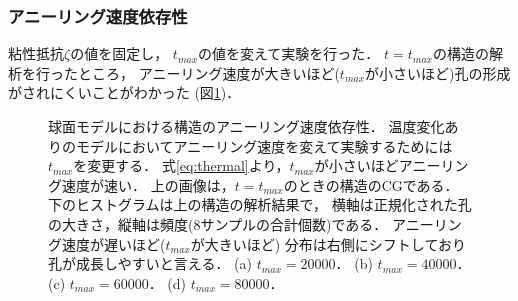 \subsubsection{アニーリング速度依存性}
粘性抵抗$\zeta$の値を固定し，
$t_{max}$の値を変えて実験を行った．
%     
$t=t_{max}$の構造の解析を行ったところ，
アニーリング速度が大きいほど($t_{max}$が小さいほど)孔の形成がされにくいことがわかった
(図\ref{fig:result_sphere_anearing_speed_comb})．
%     
\begin{figure}
    \centering
    
    \caption{
        球面モデルにおける構造のアニーリング速度依存性．
        温度変化ありのモデルにおいてアニーリング速度を変えて実験するためには$t_{max}$を変更する．
        式\ref{eq:thermal}より，$t_{max}$が小さいほどアニーリング速度が速い．
        上の画像は，$t=t_{max}$のときの構造のCGである．
        下のヒストグラムは上の構造の解析結果で，
        横軸は正規化された孔の大きさ，縦軸は頻度(8サンプルの合計個数)である．
        アニーリング速度が遅いほど($t_{max}$が大きいほど)
        分布は右側にシフトしており孔が成長しやすいと言える．
        (a) $t_{max}=20000$．
        (b) $t_{max}=40000$．
        (c) $t_{max}=60000$．
        (d) $t_{max}=80000$．
    }
    \label{fig:result_sphere_anearing_speed_comb}
\end{figure}


